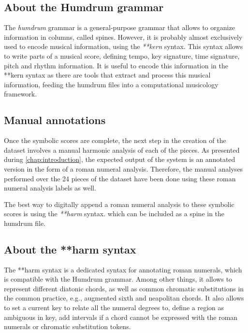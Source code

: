 \subsection{About the Humdrum grammar}
The \emph{humdrum} \cite{humdrum} grammar is a general-purpose grammar that allows to organize information in columns, called spines. However, it is probably almost exclusively used to encode musical information, using the \emph{**kern} syntax. This syntax allows to write parts of a musical score, defining tempo, key signature, time signature, pitch and rhythm information. It is useful to encode this information in the **kern syntax as there are tools that extract and process this musical information, feeding the humdrum files into a computational musicology framework.

\subsection{Manual annotations}
Once the symbolic scores are complete, the next step in the creation of the dataset involves a manual harmonic analysis of each of the pieces. As presented during \autoref{chap:introduction}, the expected output of the system is an annotated version in the form of a roman numeral analysis. Therefore, the manual analyses performed over the 24 pieces of the dataset have been done using these roman numeral analysis labels as well.

The best way to digitally append a roman numeral analysis to these symbolic scores is using the \emph{**harm} \cite{harm} syntax. which can be included as a spine in the humdrum file.

 \subsection{About the **harm syntax}
 The **harm syntax is a dedicated syntax for annotating roman numerals, which is compatible with the Humdrum grammar. Among other things, it allows to represent different diatonic chords, as well as common chromatic substitutions in the common practice, e.g., augmented sixth and neapolitan chords. It also allows to set a current key to relate all the numeral degrees to, define a region as ambiguous in key, add intervals if a chord cannot be expressed with the roman numerals or chromatic substitution tokens.

